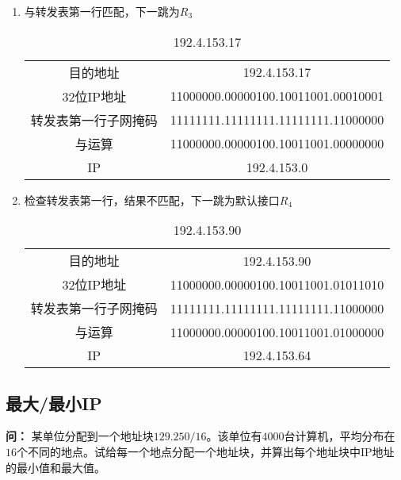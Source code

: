 \documentclass[12pt,hyperref,a4paper,UTF8]{ctexart}
\begin{document}
\begin{enumerate}[label=(\arabic*),leftmargin=2.2\parindent]
    \item 与转发表第一行匹配，下一跳为$R_3$
    \begin{table}[h]
        \centering
        \begin{tabular}{c|c}
            \toprule
            目的地址 & 192.4.153.17\\
            32位IP地址 & 11000000.00000100.10011001.00010001\\
            转发表第一行子网掩码 & 11111111.11111111.11111111.11000000\\
            与运算 & 11000000.00000100.10011001.00000000\\
            IP & 192.4.153.0\\
            \bottomrule
        \end{tabular}
        \caption{192.4.153.17}\label{192.4.153.17}
    \end{table}

    \item 检查转发表第一行，结果不匹配，下一跳为默认接口$R_4$
    \begin{table}[h]
        \centering
        \begin{tabular}{c|c}
            \toprule
            目的地址 & 192.4.153.90\\
            32位IP地址 & 11000000.00000100.10011001.01011010\\
            转发表第一行子网掩码 & 11111111.11111111.11111111.11000000 \\
            与运算 & 11000000.00000100.10011001.01000000\\
            IP & 192.4.153.64\\
            \bottomrule
        \end{tabular}
        \caption{192.4.153.90}\label{192.4.153.90}
    \end{table}

\end{enumerate}

\subsection{最大/最小IP}
\textbf{问：}
某单位分配到一个地址块$129.250/16$。该单位有$4000$台计算机，平均分布在$16$个不同的地点。试给每一个地点分配一个地址块，并算出每个地址块中IP地址的最小值和最大值。
\end{document}
